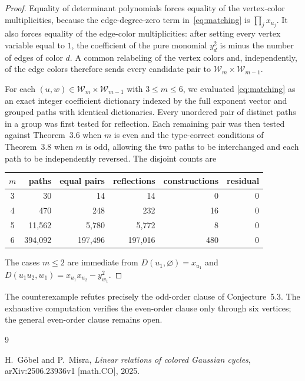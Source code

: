\documentclass[11pt]{amsart}
\theoremstyle{remark}
\newcommand{\W}{\mathcal W}
\begin{document}
\begin{proof}
Equality of determinant polynomials forces equality of the vertex-color
multiplicities, because the edge-degree-zero term in~\eqref{eq:matching} is
$\prod_j x_{u_j}$. It also forces equality of the edge-color multiplicities:
after setting every vertex variable equal to $1$, the coefficient of the pure
monomial $y_d^2$ is minus the number of edges of color $d$. A common
relabeling of the vertex colors and, independently, of the edge colors
therefore sends every candidate pair to
$\W_m\times\W_{m-1}$.

For each $(u,w)\in\W_m\times\W_{m-1}$ with $3\leq m\leq6$, we evaluated
\eqref{eq:matching} as an exact integer coefficient dictionary indexed by the
full exponent vector and grouped paths with identical dictionaries. Every
unordered pair of distinct paths in a group was first tested for reflection.
Each remaining pair was then tested against Theorem~3.6 when $m$ is even and
the type-correct conditions of Theorem~3.8 when $m$ is odd, allowing the two
paths to be interchanged and each path to be independently reversed. The
disjoint counts are
\begin{center}
\small
\setlength{\tabcolsep}{5pt}
\begin{tabular}{crrrrr}
\toprule
$m$ & paths & equal pairs & reflections & constructions & residual \\
\midrule
3 & 30        & 14        & 14        & 0   & 0 \\
4 & 470       & 248       & 232       & 16  & 0 \\
5 & 11{,}562  & 5{,}780   & 5{,}772   & 8   & 0 \\
6 & 394{,}092 & 197{,}496 & 197{,}016 & 480 & 0 \\
\bottomrule
\end{tabular}
\end{center}
The cases $m\leq2$ are immediate from
$D(u_1,\varnothing)=x_{u_1}$ and
$D(u_1u_2,w_1)=x_{u_1}x_{u_2}-y_{w_1}^2$.

\end{proof}

The counterexample refutes precisely the odd-order clause of
Conjecture~5.3. The exhaustive computation verifies the even-order clause
only through six vertices; the general even-order clause remains open.

\begin{thebibliography}{9}

H.~G\"obel and P.~Misra,
\emph{Linear relations of colored Gaussian cycles},
arXiv:2506.23936v1 [math.CO], 2025.

\end{thebibliography}
\end{document}
